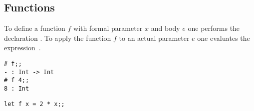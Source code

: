 \documentclass[11pt]{article}
\begin{document}










\subsection {Functions}

To define a function $f$ with formal parameter $x$ and body $e$ one performs the
declaration
\linebreak
.  To apply the function $f$ to an actual parameter $e$ one
evaluates the expression~.

\begin{session}
\emlsession
\begin{verbatim}
# f;;
- : Int -> Int
# f 4;;
8 : Int
\end{verbatim}
\emlfile
\begin{verbatim}
let f x = 2 * x;;
\end{verbatim}
\emlend
\end{session}
\end{document}
